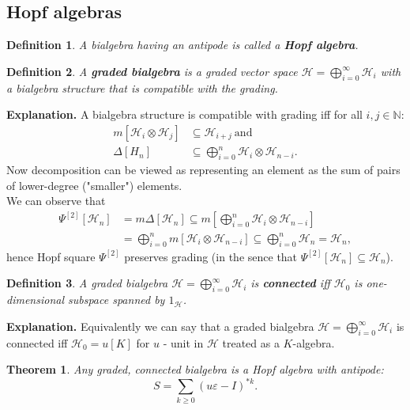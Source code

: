 \documentclass[a4paper, 12pt]{article}
\newtheorem{definition}{Definition}
\newtheorem{theorem}{Theorem}
\begin{document}
\subsection{Hopf algebras}
\begin{definition}
A bialgebra having an antipode is called a \textbf{Hopf algebra}.
\end{definition}
\begin{definition}
A \textbf{graded bialgebra} is a graded vector space
$\mathcal{H} = \displaystyle\bigoplus^{\infty}_{i=0}\mathcal{H}_i$ with a bialgebra structure that is
compatible with the grading.
\end{definition}
\textbf{Explanation. } A bialgebra structure is compatible with grading iff for all $i, j \in \mathbb{N}$:
\begin{align*}
m[\mathcal{H}_i \otimes \mathcal{H}_j] &\subseteq \mathcal{H}_{i+j} \mathrm{\ and} \\
\Delta[H_n] &\subseteq \bigoplus^{n}_{i = 0} \mathcal{H}_i \otimes \mathcal{H}_{n-i}.
\end{align*}
\indent Now decomposition can be viewed as representing an element as the sum of pairs of lower-degree
("smaller") elements. \\
\indent We can observe that
\begin{align*}
\Psi^{[2]}[\mathcal{H}_n] &= m\Delta[\mathcal{H}_n] \subseteq m[\bigoplus^n_{i = 0} \mathcal{H}_i \otimes
\mathcal{H}_{n - i}] \\ &= \bigoplus^n_{i = 0} m[\mathcal{H}_i \otimes \mathcal{H}_{n - i}] \subseteq
\bigoplus^n_{i = 0} \mathcal{H}_n = \mathcal{H}_n,
\end{align*}
hence Hopf square $\Psi^{[2]}$ preserves grading
(in the sence that $\Psi^{[2]}[\mathcal{H}_n] \subseteq \mathcal{H}_n$).
\begin{definition}
A graded bialgebra $\mathcal{H} = \displaystyle\bigoplus^{\infty}_{i=0}\mathcal{H}_i$ is
\textbf{connected} iff $\mathcal{H}_0$ is one-dimensional subspace spanned by $1_\mathcal{H}$.
\end{definition}
\noindent \textbf{Explanation. } Equivalently we can say that a graded bialgebra
$\mathcal{H} = \displaystyle\bigoplus^{\infty}_{i=0}\mathcal{H}_i$ is
connected iff $\mathcal{H}_0 = u[K]$ for $u$ - unit in $\mathcal{H}$ treated as a $K$-algebra.
\begin{theorem}
Any graded, connected bialgebra is a Hopf algebra with antipode:
\begin{equation*}
S = \sum_{k \geq 0} (u\varepsilon - I)^{*k}.
\end{equation*}
\end{theorem}
\end{document}
